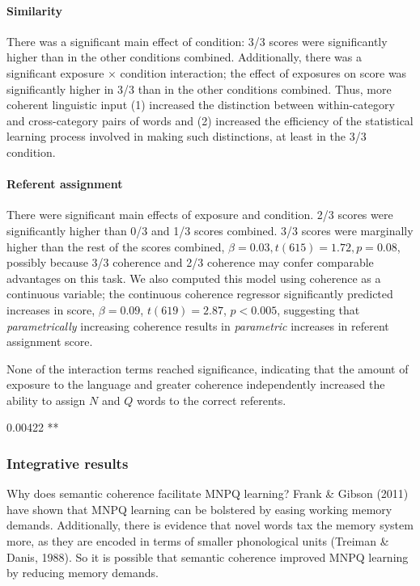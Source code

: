 \documentclass[man,floatsintext]{apa6}
\begin{document}
\paragraph{Similarity} There was a significant main effect of
condition: 3/3 scores were significantly higher than in the other
conditions combined. Additionally, there was a significant exposure
$\times$ condition interaction; the effect of exposures on score was
significantly higher in 3/3 than in the other conditions
combined. Thus, more coherent linguistic input (1) increased the
distinction between within-category and cross-category pairs of words
and (2) increased the efficiency of the statistical learning process
involved in making such distinctions, at least in the 3/3 condition.

\paragraph{Referent assignment}

There were significant main effects of exposure and condition. 2/3
scores were significantly higher than 0/3 and 1/3 scores combined. 3/3
scores were marginally higher than the rest of the scores combined,
$\beta = 0.03, t(615) = 1.72, p = 0.08$, possibly because 3/3
coherence and 2/3 coherence may confer comparable advantages on this
task. We also computed this model using coherence as a continuous
variable; the continuous coherence regressor significantly predicted
increases in score, $\beta = 0.09$, $t(619) = 2.87$, $p < 0.005$,
suggesting that \emph{parametrically} increasing coherence results in
\emph{parametric} increases in referent assignment score.

None of the interaction terms reached significance, indicating that
the amount of exposure to the language and greater coherence
independently increased the ability to assign $N$ and $Q$ words to the
correct referents.

0.00422 **

\subsubsection{Integrative results} Why does semantic coherence
facilitate MNPQ learning? Frank \& Gibson (2011) have shown that MNPQ
learning can be bolstered by easing working memory
demands. Additionally, there is evidence that novel words tax the
memory system more, as they are encoded in terms of smaller
phonological units (Treiman \& Danis, 1988). So it is possible that
semantic coherence improved MNPQ learning by reducing memory demands.
\end{document}
